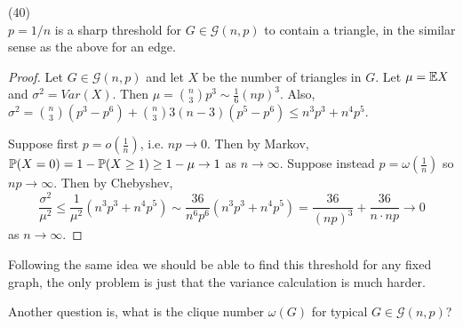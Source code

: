 \documentclass[a4paper]{article}
\begin{document}
\begin{prop} (40)\\
$p = 1/n$ is a sharp threshold for $G \in \mathcal{G}(n,p)$ to contain a triangle, in the similar sense as the above for an edge.
\begin{proof}
Let $G \in \mathcal{G}(n,p)$ and let $X$ be the number of triangles in $G$. Let $\mu = \E X$ and $\sigma^2 = Var(X)$. Then $\mu = {n \choose 3} p^3 \sim \frac{1}{6} (np)^3$. Also, $\sigma^2 = {n \choose 3} (p^3-p^6) + {n \choose 3} 3(n-3)(p^5-p^6) \leq n^3p^3 + n^4p^5$.

Suppose first $p=o(\frac{1}{n})$, i.e. $np \to 0$. Then by Markov, $\P(X=0) = 1-\P(X \geq 1) \geq 1-\mu \to 1$ as $n \to \infty$. Suppose instead $p=\omega(\frac{1}{n})$ so $np \to \infty$. Then by Chebyshev, $$\frac{\sigma^2}{\mu^2} \leq \frac{1}{\mu^2} (n^3p^3+n^4p^5) \sim \frac{36}{n^6p^6} (n^3p^3+n^4p^5) = \frac{36}{(np)^3} + \frac{36}{n \cdot np} \to 0$$ as $n \to \infty$.
\end{proof}
\end{prop}

Following the same idea we should be able to find this threshold for any fixed graph, the only problem is just that the variance calculation is much harder.

Another question is, what is the clique number $\omega(G)$ for typical $G \in \mathcal{G}(n,p)$?
\end{document}
